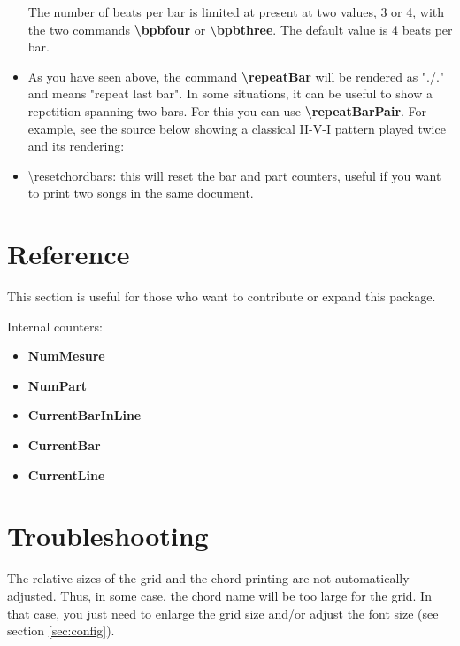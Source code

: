 \documentclass[11pt]{article}
\newcommand{\btt}{\bfseries \ttfamily }
\newcommand{\tbs}{\textbackslash{}}
\begin{document}
\begin{itemize}
The number of beats per bar is limited at present at two values, 3 or 4, with the two commands
{\btt \tbs bpbfour} or {\btt \tbs bpbthree}.
The default value is 4 beats per bar.

\item As you have seen above, the command {\btt \tbs repeatBar} will be rendered as "./."
and means "repeat last bar".
In some situations, it can be useful to show a repetition spanning two bars.
For this you can use {\btt \tbs repeatBarPair}.
For example, see the source below showing a classical II-V-I pattern played twice and its rendering:

\noindent
\begin{minipage}{0.45\textwidth}

\end{minipage}
%
\begin{minipage}{0.42\textwidth}
\countbarsNo

\end{minipage}

\item {\ttfamily \textbackslash resetchordbars}: this will reset the bar and part counters, useful if you want to print two songs in the same document.
\end{itemize}


\section{Reference}

This section is useful for those who want to contribute or expand this package.

Internal counters:

\begin{itemize}
\item {\btt NumMesure}
\item {\btt NumPart}
\item {\btt CurrentBarInLine}
\item {\btt CurrentBar}
\item {\btt CurrentLine}
\end{itemize}

\section{Troubleshooting}

The relative sizes of the grid and the chord printing are not automatically adjusted.
Thus, in some case, the chord name will be too large for the grid.
In that case, you just need to enlarge the grid size and/or adjust the font size (see section \ref {sec:config}).
\end{document}
